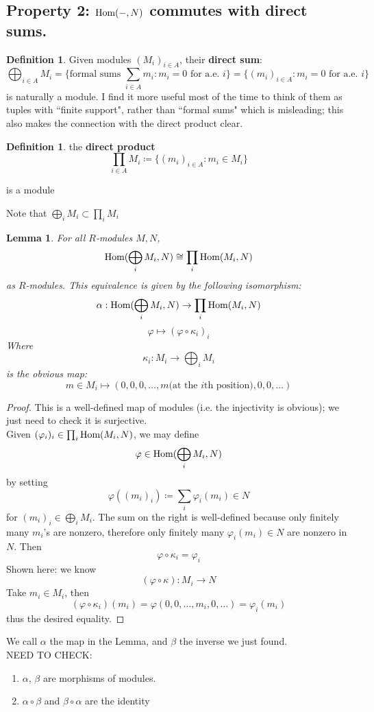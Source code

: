 \documentclass[12pt]{article}
\newcommand{\ho}[2]{\textup{Hom}(#1,#2)}
\newtheorem{lemma}[theorem]{Lemma}
\theoremstyle{definition}
\newtheorem{definition}[theorem]{Definition}
\begin{document}
\subsection*{Property 2: $\ho{-}{N}$ commutes with direct sums.}

    \begin{definition}
    Given modules $(M_i)_{i\in A}$, their \textbf{direct sum}:
    \[
    \bigoplus_{i\in A} M_i = \{\text{formal sums }\sum_{i\in A}m_i: m_i =0\text{ for a.e. $i$}\} = \{(m_i)_{i\in A}: m_i=0\text{ for a.e. }i\}
    \]
    is naturally a module. I find it more useful most of the time to think of them as tuples with ``finite support", rather than ``formal sums" which is misleading; this also makes the connection with the direct product clear.
    \end{definition}
    \begin{definition}
    the \textbf{direct product} 
    \[
    \prod_{i\in A} M_i \coloneqq \{(m_i)_{i\in A}: m_i\in M_i\}
    \]
    
    is a module
    \end{definition}
    Note that $\bigoplus_i M_i \subset \prod_i M_i$
    \begin{lemma}
    For all $R$-modules $M, N$,
    \[
    \ho{\bigoplus_i M_i}{ N} \cong \prod_i \ho{M_i}{N}
    \]
    as $R$-modules. This equivalence is given by the following isomorphism:
    \[
    \alpha: \ho{\bigoplus_i M_i}{ N} \rightarrow \prod_i \ho{M_i}{N}
    \]
    \[
    \varphi \mapsto (\varphi \circ \kappa_i)_i
    \]
    Where
    \[
    \kappa_i: M_i \rightarrow \bigoplus_i M_i
    \]
    is the obvious map:
    \[
    m \in M_i \mapsto (0,0,0, \dots ,m \text{(at the $i$th position)} ,0,0,\dots)
    \]
    
    \end{lemma}
    \begin{proof}
    This is a well-defined map of modules (i.e. the injectivity is obvious); we just need to check it is surjective. \\
    Given $(\varphi_i)_i\in \prod_i \ho{M_i}{N} $, we may define
    \[
    \varphi \in \ho{\bigoplus_i M_i}{N}
    \]
    by setting
    \[
    \varphi((m_i)_i) \coloneqq \sum_i \varphi_i(m_i) \in N
    \]
    for $(m_i)_i \in \bigoplus_i M_i$. The sum on the right is well-defined because only finitely many $m_i$'s are nonzero, therefore only finitely many $\varphi_i(m_i) \in N$ are nonzero in $N$.
    Then 
    \[
    \varphi \circ \kappa_i = \varphi_i
    \]
    Shown here: we know
    \[
    (\varphi \circ \kappa): M_i \rightarrow N
    \]
    Take $m_i\in M_i$, then
    \[
    (\varphi\circ \kappa_i)(m_i) = \varphi(0,0,\dots,m_i,0,\dots)=\varphi_i(m_i)
    \]
    thus the desired equality.
    \end{proof}
    We call $\alpha$ the map in the Lemma, and $\beta$ the inverse we just found. \\
    NEED TO CHECK: 
    \begin{enumerate}
        \item $\alpha$, $\beta$ are morphisms of modules.
        \item $\alpha \circ \beta$ and $\beta \circ \alpha$ are the identity
    \end{enumerate}
\end{document}
